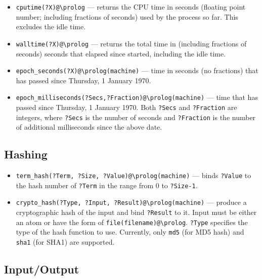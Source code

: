 \documentclass[11pt]{article}
\newcommand{\ERGO}{\mbox{\smaller{\ensuremath{\cal{E}}\smaller{{\sc{RGO}}}}}\xspace}
\newcommand{\FLSYSTEM}{\ERGO}
\newcommand{\bs}{\textbackslash}
\begin{document}
\begin{itemize}
\item  \texttt{cputime(?X)@\bs{}prolog}  --- returns the CPU time in seconds
  (floating point number; including fractions of seconds)
  used by the \FLSYSTEM process so far. This excludes the idle time.
\item  \texttt{walltime(?X)@\bs{}prolog}  --- returns the total time in
  (including fractions of seconds)
  seconds that elapsed since \FLSYSTEM started, including the idle time.
\item  \texttt{epoch\_seconds(?X)@\bs{}prolog(machine)} --- time in seconds
  (no fractions)
  that has passed since Thursday, 1 January 1970.
\item  \texttt{epoch\_milliseconds(?Secs,?Fraction)@\bs{}prolog(machine)}
  --- time
  that has passed since Thursday, 1 January 1970.
  Both \texttt{?Secs} and \texttt{?Fraction} are integers, where
  \texttt{?Secs} is the number of seconds and \texttt{?Fraction} is
  the number of additional milliseconds since the above date.   
\end{itemize}

\subsection{Hashing}

\begin{itemize}
\item  \texttt{term\_hash(?Term, ?Size, ?Value)@\bs{}prolog(machine)} --- binds \texttt{?Value} to
  the hash number of \texttt{?Term} in the range from 0 to
  \texttt{?Size-1}.
\item \texttt{crypto\_hash(?Type, ?Input, ?Result)@\bs{}prolog(machine)}
  --- produce a cryptographic hash of the input and bind \texttt{?Result} to it.
  Input must be either an atom or have the form of
  \texttt{file(filename)@\bs{}prolog}.
  \texttt{?Type} specifies the type of the hash function to use. Currently,
  only \texttt{md5}  (for MD5 hash) and \texttt{sha1} (for SHA1) 
  are supported.
\end{itemize}

\subsection{Input/Output}
\end{document}
